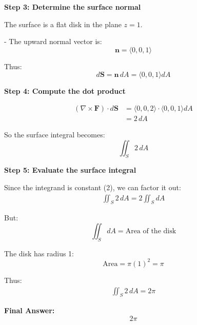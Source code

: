 \begin{examplebox}
    \textbf{Step 3: Determine the surface normal}

    The surface is a flat disk in the plane $z=1$.

    - The upward normal vector is:
    \[
        \mathbf{n} = \langle 0,0,1 \rangle
    \]

    Thus:
    \[
        d\mathbf{S} = \mathbf{n}\, dA = \langle 0,0,1 \rangle dA
    \]

    \textbf{Step 4: Compute the dot product}

    \begin{align*}
        (\nabla \times \mathbf{F}) \cdot d\mathbf{S}
         & = \langle 0,0,2 \rangle \cdot \langle 0,0,1 \rangle dA \\
         & = 2\, dA
    \end{align*}

    So the surface integral becomes:
    \[
        \iint_S 2\, dA
    \]

    \textbf{Step 5: Evaluate the surface integral}

    Since the integrand is constant (2), we can factor it out:
    \begin{align*}
        \iint_S 2\, dA = 2 \iint_S dA
    \end{align*}

    But:
    \[
        \iint_S dA = \text{Area of the disk}
    \]

    The disk has radius 1:
    \[
        \text{Area} = \pi (1)^2 = \pi
    \]

    Thus:
    \begin{align*}
        \iint_S 2\, dA = 2\pi
    \end{align*}

    \textbf{Final Answer:}
    \[
        \boxed{2\pi}
    \]
\end{examplebox}